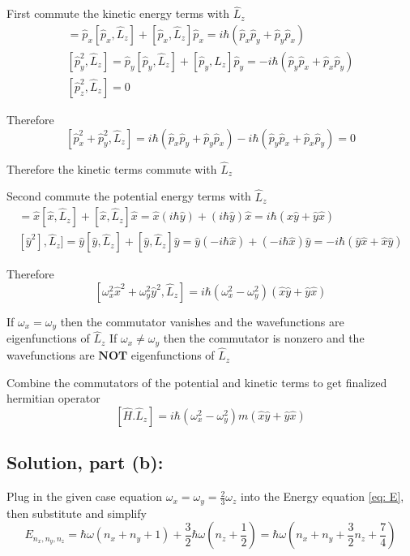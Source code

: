 \documentclass[12pt]{article}
\begin{document}
        First commute the kinetic energy terms with $\hat{L}_z$
        \begin{align*}
            [\hat{p}_x^2, \hat{L}_z] = \hat{p}_x [\hat{p}_x, \hat{L}_z] + [\hat{p}_x, \hat{L}_z] \hat{p}_x = i \hbar (\hat{p}_x \hat{p}_y + \hat{p}_y \hat{p}_x) \\
            [\hat{p}_y^2, \hat{L}_z] = \hat{p}_y [\hat{p}_y, \hat{L}_z] + [\hat{p}_y, \hat{L}_z] \hat{p}_y = -i \hbar (\hat{p}_y \hat{p}_x + \hat{p}_x \hat{p}_y)\\
            [\hat{p}_z^2, \hat{L}_z] = 0
        \end{align*}

        Therefore 
        \[
            [\hat{p}_x^2 + \hat{p}_y^2, \hat{L}_z] = i \hbar (\hat{p}_x \hat{p}_y + \hat{p}_y \hat{p}_x) -i \hbar (\hat{p}_y \hat{p}_x + \hat{p}_x \hat{p}_y) = 0
        \]

        Therefore the kinetic terms commute with $\hat{L}_z$

        Second commute the potential energy terms with $\hat{L}_z$
        \begin{align*}
            [\hat{x}^2, \hat{L}_z] = \hat{x} [\hat{x}, \hat{L}_z] + [\hat{x}, \hat{L}_z] \hat{x} = \hat{x} (i \hbar \hat{y}) + (i \hbar \hat{y})\hat{x} = i \hbar (\hat{x} \hat{y} + \hat{y} \hat{x})\\
            [\hat{y}^2], \hat{L}_z] = \hat{y} [\hat{y}, \hat{L}_z] + [\hat{y}, \hat{L}_z] \hat{y} = \hat{y} (-i \hbar \hat{x}) + (-i \hbar \hat{x})\hat{y} = -i \hbar (\hat{y} \hat{x} + \hat{x} \hat{y})
        \end{align*}

        Therefore
        \[
            [\omega_x^2 \hat{x}^2 + \omega_y^2 \hat{y}^2, \hat{L}_z] = i \hbar (\omega_x^2 - \omega_y^2) (\hat{x} \hat{y} + \hat{y} \hat{x})
        \]

        If $\omega_x = \omega_y$ then the commutator vanishes and the wavefunctions are eigenfunctions of $\hat{L}_z$
        If $\omega_x \neq \omega_y$ then the commutator is nonzero and the wavefunctions are $\boldsymbol{NOT}$ eigenfunctions of $\hat{L}_z$

        Combine the commutators of the potential and kinetic terms to get finalized hermitian operator
        \[
            [\hat{H}. \hat{L}_z] = i \hbar (\omega_x^2 - \omega_y^2) m (\hat{x}\hat{y} + \hat{y}\hat{x})
        \]

    \subsection{Solution, part (b):}
        Plug in the given case equation $\omega_x = \omega_y = \frac{2}{3} \omega_z$ into the Energy equation \ref{eq: E}, then substitute and simplify
        \[
            E_{n_x, n_y, n_z} = \hbar \omega \left(n_x + n_y + 1 \right) + \frac{3}{2} \hbar \omega \left(n_z + \frac{1}{2} \right)
            = \hbar \omega \left(n_x + n_y + \frac{3}{2} n_z + \frac{7}{4} \right)
        \]
\end{document}
